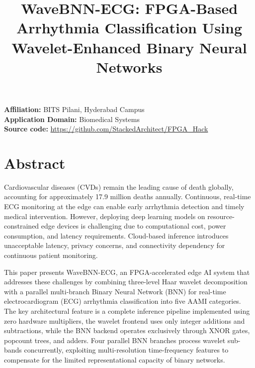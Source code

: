 \documentclass[conference]{IEEEtran}
\begin{document}

\title{WaveBNN-ECG: FPGA-Based Arrhythmia Classification Using Wavelet-Enhanced Binary Neural Networks}

\author{
\and
{}
}

\maketitle
\begin{center}
\footnotesize
\textbf{Affiliation:} BITS Pilani, Hyderabad Campus \\
\textbf{Application Domain:} Biomedical Systems \\
\textbf{Source code:} \url{https://github.com/StackedArchitect/FPGA_Hack}
\end{center}

\section{Abstract}

Cardiovascular diseases (CVDs) remain the leading cause of death globally, accounting for approximately 17.9 million deaths annually. Continuous, real-time ECG monitoring at the edge can enable early arrhythmia detection and timely medical intervention. However, deploying deep learning models on resource-constrained edge devices is challenging due to computational cost, power consumption, and latency requirements. Cloud-based inference introduces unacceptable latency, privacy concerns, and connectivity dependency for continuous patient monitoring.

This paper presents WaveBNN-ECG, an FPGA-accelerated edge AI system that addresses these challenges by combining three-level Haar wavelet decomposition with a parallel multi-branch Binary Neural Network (BNN) for real-time electrocardiogram (ECG) arrhythmia classification into five AAMI categories. The key architectural feature is a complete inference pipeline implemented using zero hardware multipliers, the wavelet frontend uses only integer additions and subtractions, while the BNN backend operates exclusively through XNOR gates, popcount trees, and adders. Four parallel BNN branches process wavelet sub-bands concurrently, exploiting multi-resolution time-frequency features to compensate for the limited representational capacity of binary networks.
\end{document}
